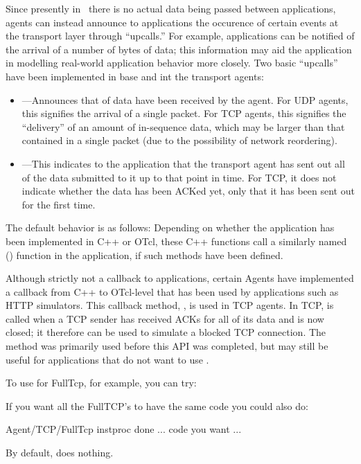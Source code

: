 Since presently in \ns~there is no actual data being passed between 
applications, agents can instead announce to applications the occurence of 
certain events at the transport layer through ``upcalls.''  For example,
applications can be notified of the arrival of a number of bytes of data;
this information may aid the application in modelling real-world application
behavior more closely.  Two basic ``upcalls'' have been implemented in 
base  and int the transport agents:
\begin{itemize} 
\item {}---Announces that  of data have been
received by the agent.  For UDP agents, this signifies the arrival of
a single packet.  For TCP agents, this signifies the ``delivery'' of an 
amount of in-sequence data, which may be larger than that contained in a 
single packet (due to the possibility of network reordering).
\item {}---This indicates to the application that the transport
agent has sent out all of the data submitted to it up to that point in time.  
For TCP, it does not indicate whether the data has been ACKed yet, only that
it has been sent out for the first time. 
\end{itemize}
The default behavior is as follows: 
Depending on whether the application has been implemented in C++ or OTcl, these
C++ functions 
call a similarly named () function in the application,
if such methods have been defined.   

Although strictly not a callback to applications, certain Agents have
implemented a callback from C++ to OTcl-level that has been used by 
applications such as HTTP simulators.  This callback method, ,
is used in TCP agents.  In TCP,  is called when a TCP sender 
has received ACKs for all of its data and is now closed; it therefore can
be used to simulate a blocked TCP connection.  The 
method was primarily used before this API was completed, but may still be
useful for applications that do not want to use .

To use  for FullTcp, for example, you can try:
If you want all the FullTCP's to have the same code you could also do:
\begin{program}
        Agent/TCP/FullTcp instproc done {} {
            ... code you want ...
        }
\end{program}
By default,  does nothing.

